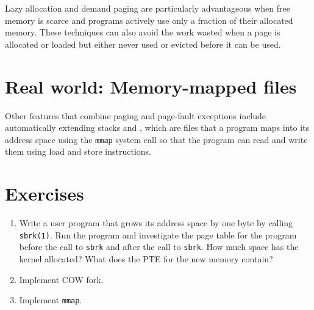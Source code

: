 Lazy allocation and demand paging are particularly advantageous when
free memory is scarce and programs actively use only a fraction of
their allocated memory. These techniques can also avoid the work
wasted when a page is allocated or loaded but either never used or
evicted before it can be used.

\section{Real world: Memory-mapped files}

Other features that combine paging and page-fault exceptions include
automatically extending stacks and ,
which are files that a program maps into its address space using
the \texttt{mmap} system call so that the program can read and write
them using load and store instructions.


\section{Exercises}

\begin{enumerate}

\item Write a user program that grows its address space by one byte by calling
\lstinline{sbrk(1)}.
Run the  program and investigate the page table for the program before the call
to
\lstinline{sbrk}
and after the call to
\lstinline{sbrk}.
How much space has the kernel allocated?  What does the
PTE
for the new memory contain?

\item Implement COW fork.

\item Implement {\tt mmap}.

\end{enumerate}
